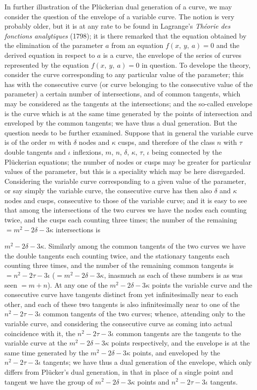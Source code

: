 \documentclass[12pt,a4paper,oneside]{book}
\begin{document}
In further illustration of the Pl\"uckerian dual generation of a curve, we may consider the question of the envelope of a variable curve. The notion is very probably older, but it is at any rate to be found in Lagrange's \textit{Th\'eorie des fonctions analytiques} (1798); it is there remarked that the equation obtained by the elimination of the parameter $a$ from an equation $f(x,\ y,\ a)=0$ and the derived equation in respect to $a$ is a curve, the envelope of the series of curves represented by the equation $f(x,\ y,\ a)=0$ in question. To develope the theory, consider the curve corresponding to any particular value of the parameter; this has with the consecutive curve (or curve belonging to the consecutive value of the parameter) a certain number of intersections, and of common tangents, which may be considered as the tangents at the intersections; and the so-called envelope is the curve which is at the same time generated by the points of intersection and enveloped by the common tangents; we have thus a dual generation. But the question needs to be further examined. Suppose that in general the variable curve is of the order $m$ with $\delta$ nodes and $\kappa$ cusps, and therefore of the class $n$ with $\tau$ double tangents and $\iota$ inflexions, $m$, $n$, $\delta$, $\kappa$, $\tau$, $\iota$ being connected by the Pl\"uckerian equations; the number of nodes or cusps may be greater for particular values of the parameter, but this is a speciality which may be here disregarded. Considering the variable curve corresponding to a given value of the parameter, or say simply the variable curve, the consecutive curve has then also $\delta$ and $\kappa$ nodes and cusps, consecutive to those of the variable curve; and it is easy to see that among the intersections of the two curves we have the nodes each counting twice, and the cusps each counting three times; the number of the remaining $=m^{2}-2\delta-3\kappa$ intersections is

\newpage
$m^{2}-2\delta-3\kappa$. Similarly among the common tangents of the two curves we have the double tangents each counting twice, and the stationary tangents each counting three times, and the number of the remaining common tangents is $=n^{2}-2\tau-3\iota$ ($=m^{2}-2\delta-3\kappa$, inasmuch as each of these numbers is as was seen $=m+n$). At any one of the $m^{2}-2\delta-3\kappa$ points the variable curve and the consecutive curve have tangents distinct from yet infinitesimally near to each other, and each of these two tangents is also infinitesimally near to one of the $n^{2}-2\tau-3\iota$ common tangents of the two curves; whence, attending only to the variable curve, and considering the consecutive curve as coming into actual coincidence with it, the $n^{2}-2\tau-3\iota$ common tangents are the tangents to the variable curve at the $m^{2}-2\delta-3\kappa$ points respectively, and the envelope is at the same time generated by the $m^{2}-2\delta-3\kappa$ points, and enveloped by the $n^{2}-2\tau-3\iota$ tangents; we have thus a dual generation of the envelope, which only differs from Pl\"ucker's dual generation, in that in place of a single point and tangent we have the group of $m^{2}-2\delta-3\kappa$ points and $n^{2}-2\tau-3\iota$ tangents.
\end{document}
